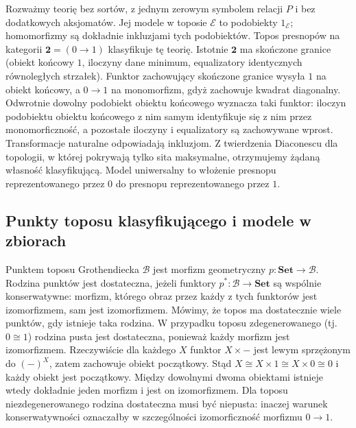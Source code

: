 \begin{przyklad}\label{cat:ex:cl-proposition-classifier}
Rozważmy teorię bez sortów, z jednym zerowym symbolem relacji $P$ i bez dodatkowych aksjomatów. Jej modele w toposie $\mathcal E$ to podobiekty $1_{\mathcal E}$; homomorfizmy są dokładnie inkluzjami tych podobiektów. Topos presnopów na kategorii $\mathbf 2=(0\to1)$ klasyfikuje tę teorię. Istotnie $\mathbf 2$ ma skończone granice (obiekt końcowy $1$, iloczyny dane minimum, equalizatory identycznych równoległych strzałek). Funktor zachowujący skończone granice wysyła $1$ na obiekt końcowy, a $0\to1$ na monomorfizm, gdyż zachowuje kwadrat diagonalny. Odwrotnie dowolny podobiekt obiektu końcowego wyznacza taki funktor: iloczyn podobiektu obiektu końcowego z nim samym identyfikuje się z nim przez monomorficzność, a pozostałe iloczyny i equalizatory są zachowywane wprost. Transformacje naturalne odpowiadają inkluzjom. Z twierdzenia Diaconescu dla topologii, w której pokrywają tylko sita maksymalne, otrzymujemy żądaną własność klasyfikującą. Model uniwersalny to włożenie presnopu reprezentowanego przez $0$ do presnopu reprezentowanego przez $1$. 
\end{przyklad}

\subsection{Punkty toposu klasyfikującego i modele w zbiorach}

\begin{definicja}\label{cat:def:cl-enough-points}
Punktem toposu Grothendiecka $\mathcal B$ jest morfizm geometryczny $p:\mathbf{Set}\to\mathcal B$. Rodzina punktów jest dostateczna, jeżeli funktory $p^*:\mathcal B\to\mathbf{Set}$ są wspólnie konserwatywne: morfizm, którego obraz przez każdy z tych funktorów jest izomorfizmem, sam jest izomorfizmem. Mówimy, że topos ma dostatecznie wiele punktów, gdy istnieje taka rodzina. W przypadku toposu zdegenerowanego (tj. $0\cong1$) rodzina pusta jest dostateczna, ponieważ każdy morfizm jest izomorfizmem. Rzeczywiście dla każdego $X$ funktor $X\times-$ jest lewym sprzężonym do $(-)^X$, zatem zachowuje obiekt początkowy. Stąd $X\cong X\times1\cong X\times0\cong0$ i każdy obiekt jest początkowy. Między dowolnymi dwoma obiektami istnieje wtedy dokładnie jeden morfizm i jest on izomorfizmem. Dla toposu niezdegenerowanego rodzina dostateczna musi być niepusta: inaczej warunek konserwatywności oznaczałby w szczególności izomorficzność morfizmu $0\to1$.
\end{definicja}

